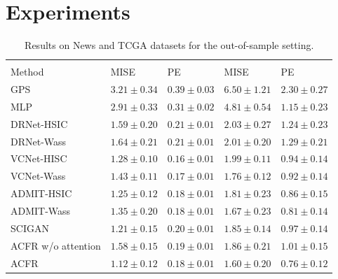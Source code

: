 \documentclass[letterpaper]{article} %
\begin{document}
\section{Experiments}
\begin{table}[ht]
	\centering
	\begin{tabular}[lrr]
		{>{\centering\arraybackslash}p{3cm}>{\centering\arraybackslash}p{1.8cm}>{\centering\arraybackslash}p{1.8cm}>{\centering\arraybackslash}p{1.8cm}>{\centering\arraybackslash}p{1.8cm}}
		\toprule
		 \multicolumn{1}{c}{} & \multicolumn{2}{c}{\textbf{News}} & \multicolumn{2}{c}{\textbf{TCGA}} \\
		Method  & MISE & PE & MISE & PE \\ 
		\midrule
        GPS & $3.21 \pm 0.34$ & $0.39 \pm 0.03$& $6.50 \pm 1.21$ &$ 2.30 \pm 0.27$\\
		 MLP & $2.91 \pm 0.33$ & $0.31 \pm 0.02$ & $4.81 \pm 0.54$& $1.15 \pm 0.23$ \\
   		DRNet-HSIC & $1.59 \pm 0.20$ & $0.21 \pm 0.01$ & $2.03 \pm 0.27$& $1.24\pm 0.23$\\
		 DRNet-Wass &$1.64 \pm 0.21$& $0.21 \pm 0.01$ &$ 2.01 \pm 0.20$& $1.29 \pm 0.21$\\
		 VCNet-HISC & $1.28 \pm 0.10$ & $\mathbf{0.16 \pm 0.01}$& $1.99 \pm 0.11$ &$0.94 \pm 0.14$\\
		 VCNet-Wass &$1.43 \pm 0.11 $& $0.17 \pm 0.01$& $ 1.76 \pm 0.12$& $0.92 \pm 0.14$\\
  		ADMIT-HSIC & $1.25 \pm 0.12$ & $0.18 \pm 0.01$ & $1.81 \pm 0.23$& $ 0.86\pm 0.15$\\
		 ADMIT-Wass &$1.35 \pm 0.20$& $0.18 \pm 0.01$ & $1.67 \pm 0.23$& $0.81 \pm 0.14$\\
   		SCIGAN & $1.21 \pm 0.15$& $0.20 \pm 0.01$& $1.85 \pm 0.14$& $0.97 \pm 0.14$\\
           ACFR w/o attention & $1.58 \pm 0.15$ & $0.19 \pm 0.01$&  ${1.86 \pm 0.21}$& $1.01 \pm 0.15$\\
		 ACFR & $\mathbf{1.12 \pm 0.12}$ & $0.18 \pm 0.01$&  $\mathbf{{1.60 \pm 0.20}}$& $\mathbf{0.76 \pm 0.12}$\\
  \bottomrule
    \end{tabular}
    \caption{Results on News and TCGA datasets for the out-of-sample setting.}\label{table:results}
\end{table}
\end{document}
